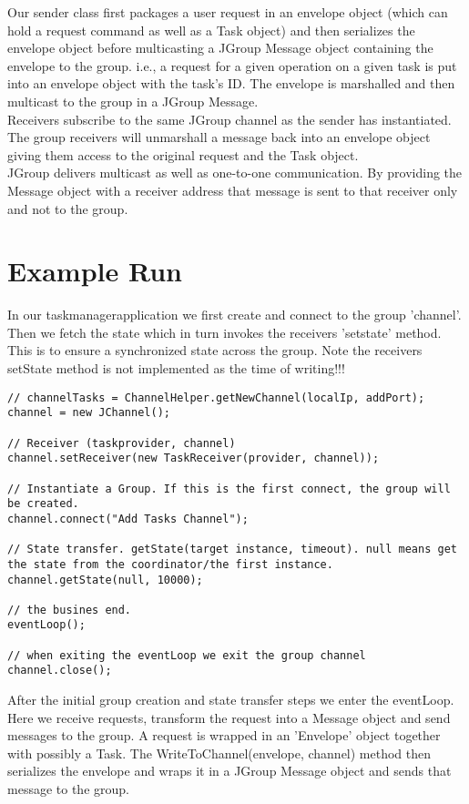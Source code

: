 Our sender class first packages a user request in an envelope object (which can hold a request command as well as a Task object) and then serializes the envelope object before multicasting a JGroup Message object containing the envelope to the group. i.e., a request for a given operation on a given task is put into an envelope object with the task's ID. The envelope is marshalled and then multicast to the group in a JGroup Message.\\

Receivers subscribe to the same JGroup channel as the sender has instantiated. The group receivers will unmarshall a message back into an envelope object giving them access to the original request and the Task object. \\

JGroup delivers multicast as well as one-to-one communication. By providing the Message object with a receiver address that message is sent to that receiver only and not to the group.

\section{Example Run}
\label{jgroup_run}
In our taskmanagerapplication we first create and connect to the group 'channel'. Then we fetch the state which in turn invokes the receivers 'setstate' method. This is to ensure a synchronized state across the group. Note the receivers setState method is not implemented as the time of writing!!!   

\begin{lstlisting}[caption=group setup]
// channelTasks = ChannelHelper.getNewChannel(localIp, addPort);
channel = new JChannel();

// Receiver (taskprovider, channel) 
channel.setReceiver(new TaskReceiver(provider, channel));

// Instantiate a Group. If this is the first connect, the group will be created.
channel.connect("Add Tasks Channel");

// State transfer. getState(target instance, timeout). null means get the state from the coordinator/the first instance.        
channel.getState(null, 10000);

// the busines end.
eventLoop();

// when exiting the eventLoop we exit the group channel
channel.close();
\end{lstlisting}

After the initial group creation and state transfer steps we enter the eventLoop. Here we receive requests, transform the request 
into a Message object and send messages to the group. A request is wrapped in an 'Envelope' object together with possibly a Task.
The WriteToChannel(envelope, channel) method then serializes the envelope and wraps it in a JGroup Message object and sends that message to the group.\\

